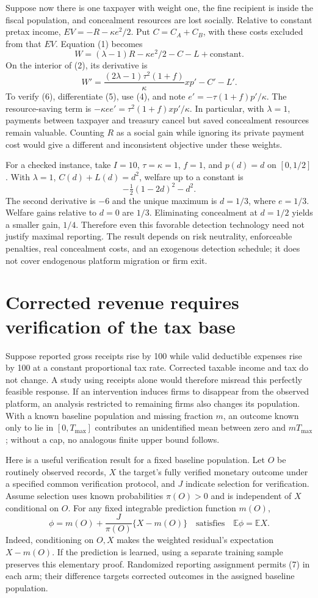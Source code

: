 \documentclass[11pt]{article}
\newcommand{\E}{\mathbb E}
\begin{document}
Suppose now there is one taxpayer with weight one, the fine recipient is inside the fiscal population, and concealment resources are lost socially. Relative to constant pretax income, $EV=-R-\kappa e^2/2$. Put $C=C_A+C_B$, with these costs excluded from that $EV$. Equation (1) becomes
\[
 W=(\lambda-1)R-\kappa e^2/2-C-L+\text{constant}.             \tag{5}
\]
On the interior of (2), its derivative is
\[
 W'=\frac{(2\lambda-1)\tau^2(1+f)}{\kappa}x p'-C'-L'.       \tag{6}
\]
To verify (6), differentiate (5), use (4), and note $e'=-\tau(1+f)p'/\kappa$. The resource-saving term is $-\kappa e e'=\tau^2(1+f)xp'/\kappa$. In particular, with $\lambda=1$, payments between taxpayer and treasury cancel but saved concealment resources remain valuable. Counting $R$ as a social gain while ignoring its private payment cost would give a different and inconsistent objective under these weights.

For a checked instance, take $I=10$, $\tau=\kappa=1$, $f=1$, and $p(d)=d$ on $[0,1/2]$. With $\lambda=1$, $C(d)+L(d)=d^2$, welfare up to a constant is
\[
 -\tfrac12(1-2d)^2-d^2.
\]
The second derivative is $-6$ and the unique maximum is $d=1/3$, where $e=1/3$. Welfare gains relative to $d=0$ are $1/3$. Eliminating concealment at $d=1/2$ yields a smaller gain, $1/4$. Therefore even this favorable detection technology need not justify maximal reporting. The result depends on risk neutrality, enforceable penalties, real concealment costs, and an exogenous detection schedule; it does not cover endogenous platform migration or firm exit.

\section*{Corrected revenue requires verification of the tax base}
Suppose reported gross receipts rise by 100 while valid deductible expenses rise by 100 at a constant proportional tax rate. Corrected taxable income and tax do not change. A study using receipts alone would therefore misread this perfectly feasible response. If an intervention induces firms to disappear from the observed platform, an analysis restricted to remaining firms also changes its population. With a known baseline population and missing fraction $m$, an outcome known only to lie in $[0,T_{\max}]$ contributes an unidentified mean between zero and $mT_{\max}$; without a cap, no analogous finite upper bound follows.

Here is a useful verification result for a fixed baseline population. Let $O$ be routinely observed records, $X$ the target's fully verified monetary outcome under a specified common verification protocol, and $J$ indicate selection for verification. Assume selection uses known probabilities $\pi(O)>0$ and is independent of $X$ conditional on $O$. For any fixed integrable prediction function $m(O)$,
\[
 \phi=m(O)+\frac{J}{\pi(O)}\{X-m(O)\}
 \quad\text{satisfies}\quad \E\phi=\E X.                    \tag{7}
\]
Indeed, conditioning on $O,X$ makes the weighted residual's expectation $X-m(O)$. If the prediction is learned, using a separate training sample preserves this elementary proof. Randomized reporting assignment permits (7) in each arm; their difference targets corrected outcomes in the assigned baseline population.
\end{document}
